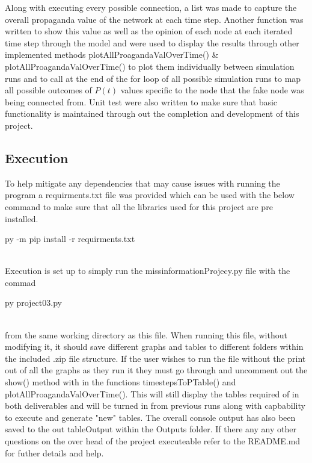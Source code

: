 \documentclass[letterpaper]{article}
\begin{document}
Along with executing every possible connection, a list was made to capture the overall propaganda value of the network at each time step.  Another function was written to show this value as well as the opinion of each node at each iterated time step through the model and were used to display the results through other implemented methods plotAllProagandaValOverTime() \& plotAllProagandaValOverTime() to plot them individually between simulation runs and to call at the end of the for loop of all possible simulation runs to map all possible outcomes of $P(t)$ values specific to the node that the fake node was being connected from.  Unit test were also written to make sure that basic functionality is maintained through out the completion and development of this project.

\subsection{Execution}
To help mitigate any dependencies that may cause issues with running the program a requirments.txt file was provided which can be used with the below command to make sure that all the libraries used for this project are pre installed.\\
\begin{center}
py -m pip install -r requirments.txt\\
\quad \\
\end{center}
Execution is set up to simply run the missinformationProjecy.py file with the commad\\
\begin{center}
py project03.py\\
\quad \\
\end{center}
from the same working directory as this file. When running this file, without modifying it, it should save different graphs and tables to different folders within the included .zip file structure.  If the user wishes to run the file without the print out of all the graphs as they run it they must go through and uncomment out the show() method with in the functions timestepsToPTable() and plotAllProagandaValOverTime().  This will still display the tables required of in both deliverables and will be turned in from previous runs along with capbability to execute and generate "new" tables.  The overall console output has also been saved to the out tableOutput within the Outputs folder.  If there any any other questions on the over head of the project executeable refer to the README.md for futher details and help.\\
\end{document}
